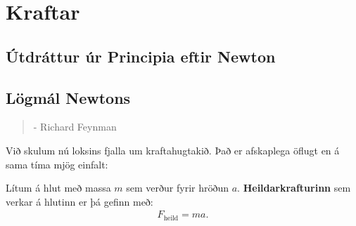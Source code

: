 
\chapter{Kraftar}

\section{Útdráttur úr Principia eftir Newton}



\newpage

\section{Lögmál Newtons}

\begin{quote}
    \textit{}
    \begin{flushright}
    - Richard Feynman
    \end{flushright}
\end{quote}

Við skulum nú loksins fjalla um kraftahugtakið. Það er afskaplega öflugt en á sama tíma mjög einfalt:

\begin{tcolorbox}
\begin{definition}
Lítum á hlut með massa $m$ sem verður fyrir hröðun $a$. \textbf{Heildarkrafturinn} sem verkar á hlutinn er þá gefinn með:
\begin{align*}
    F_{\text{heild}} = ma.
\end{align*}
\end{definition}
\end{tcolorbox}

